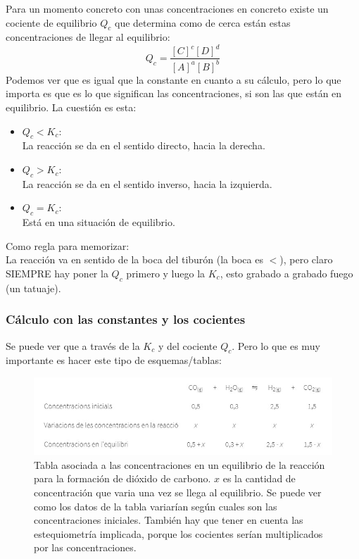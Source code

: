 \documentclass[arial,a4paper,print]{article}
\begin{document}
Para un momento concreto con unas concentraciones en concreto existe un cociente de equilibrio $Q_{c}$ que determina como de cerca están estas concentraciones de llegar al equilibrio:
\begin{equation*}
	Q_{c} = \frac{[C]^{c}[D]^{d}}{[A]^{a}[B]^{b}}
\end{equation*}
Podemos ver que es igual que la constante en cuanto a su cálculo, pero lo que importa es que es lo que significan las concentraciones, si son las que están en equilibrio. La cuestión es esta:
\begin{itemize}
\item $Q_{c} < K_{c}$:\\
La reacción se da en el sentido directo, hacia la derecha.

\item $Q_{c} > K_{c}$:\\
La reacción se da en el sentido inverso, hacia la izquierda. 

\item $Q_{c} = K_{c}$:\\
Está en una situación de equilibrio. 
\end{itemize}

Como regla para memorizar: \\
La reacción va en sentido de la boca del tiburón (la boca es $<$), pero claro SIEMPRE hay poner la $Q_{c}$ primero y luego la $K_{c}$, esto grabado a grabado fuego (un tatuaje). 

\subsubsection{Cálculo con las constantes y los cocientes}

Se puede ver que a través de la $K_{c}$ y del cociente $Q_{c}$. Pero lo que es muy importante es hacer este tipo de esquemas/tablas:
\begin{figure}[H]
	\centering
	\includegraphics[width=0.7\linewidth]{figures/tabla_Kc}
	\caption{Tabla asociada a las concentraciones en un equilibrio de la reacción para la formación de dióxido de carbono. $x$ es la cantidad de concentración que varia una vez se llega al equilibrio. Se puede ver como los datos de la tabla variarían según cuales son las concentraciones iniciales. También hay que tener en cuenta las estequiometría implicada, porque los cocientes serían multiplicados por las concentraciones.}
	\label{fig:tablakc}
\end{figure}
\end{document}
